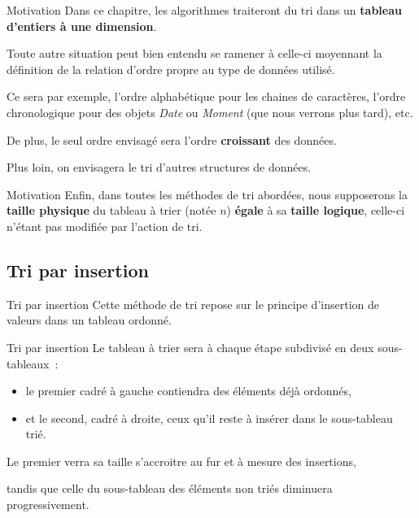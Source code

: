 \begin{frame}{Motivation}
	Dans ce chapitre, les algorithmes traiteront du tri dans un
	\textbf{tableau d’entiers à une dimension}. 
	
	\bigskip
	
	Toute autre	situation peut bien entendu se ramener à celle-ci moyennant la
	définition de la relation d’ordre propre au type de données utilisé. 
	
	\bigskip
	
	Ce sera par exemple, l’ordre alphabétique pour les chaines de caractères,
	l’ordre chronologique pour des objets \textit{Date} ou
	\textit{Moment} (que nous verrons
	plus tard), etc.
	
	\bigskip
	
	De plus, le seul ordre envisagé sera l’ordre
	\textbf{croissant} des données. 
	
	\bigskip
	
	Plus loin, on envisagera le tri 
	d'autres structures de données.
\end{frame}

\begin{frame}{Motivation}
	Enfin, dans toutes les méthodes de tri abordées, nous supposerons la
	\textbf{taille physique} du tableau à trier (notée $n$) \textbf{égale} 
	à sa \textbf{taille	logique}, 
	celle-ci n’étant pas modifiée par l’action de tri.
\end{frame}

\subsection{Tri par insertion}

\begin{frame}{Tri par insertion}
	Cette méthode de tri repose sur le principe d’insertion de valeurs dans
	un tableau ordonné. 
\end{frame}

\begin{frame}{Tri par insertion}
	Le tableau à trier sera à chaque étape subdivisé en deux sous-tableaux~:
	\begin{itemize}
		\item
		le premier cadré à gauche contiendra des éléments déjà ordonnés, 
		\item
		et le	second, cadré à droite, ceux qu’il reste à insérer dans 
		le sous-tableau	trié. 
	\end{itemize}
	
	Le premier verra sa taille s’accroitre au fur et à mesure des
	insertions, 
	
	tandis que celle du sous-tableau des éléments non triés
	diminuera progressivement.
\end{frame}

